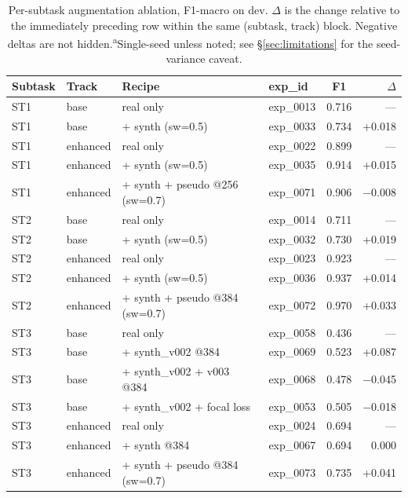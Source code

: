 \begin{table}[h]
\centering
\small
\caption{Per-subtask augmentation ablation, F1-macro on dev. $\Delta$ is the change
relative to the immediately preceding row within the same (subtask, track) block.
Negative deltas are not hidden.\textsuperscript{a}Single-seed unless noted; see \S\ref{sec:limitations} for the seed-variance caveat.}
\label{tab:ablation}
\begin{tabular}{llllcr}
\toprule
Subtask & Track & Recipe & exp\_id & F1 & $\Delta$ \\
\midrule
ST1 & base     & real only                          & exp\_0013 & 0.716 & ---     \\ %
ST1 & base     & + synth (sw=0.5)                   & exp\_0033 & 0.734 & +0.018 \\ %
\addlinespace
ST1 & enhanced & real only                          & exp\_0022 & 0.899 & ---     \\ %
ST1 & enhanced & + synth (sw=0.5)                   & exp\_0035 & 0.914 & +0.015 \\ %
ST1 & enhanced & + synth + pseudo @256 (sw=0.7)     & exp\_0071 & 0.906 & $-$0.008 \\ %
\midrule
ST2 & base     & real only                          & exp\_0014 & 0.711 & ---     \\ %
ST2 & base     & + synth (sw=0.5)                   & exp\_0032 & 0.730 & +0.019 \\ %
\addlinespace
ST2 & enhanced & real only                          & exp\_0023 & 0.923 & ---     \\ %
ST2 & enhanced & + synth (sw=0.5)                   & exp\_0036 & 0.937 & +0.014 \\ %
ST2 & enhanced & + synth + pseudo @384 (sw=0.7)     & exp\_0072 & 0.970 & +0.033 \\ %
\midrule
ST3 & base     & real only                          & exp\_0058 & 0.436 & ---     \\ %
ST3 & base     & + synth\_v002 @384                 & exp\_0069 & 0.523 & +0.087 \\ %
ST3 & base     & + synth\_v002 + v003 @384          & exp\_0068 & 0.478 & $-$0.045 \\ %
ST3 & base     & + synth\_v002 + focal loss         & exp\_0053 & 0.505 & $-$0.018 \\ %
\addlinespace
ST3 & enhanced & real only                          & exp\_0024 & 0.694 & ---     \\ %
ST3 & enhanced & + synth @384                       & exp\_0067 & 0.694 & 0.000  \\ %
ST3 & enhanced & + synth + pseudo @384 (sw=0.7)     & exp\_0073 & 0.735 & +0.041 \\ %
\bottomrule
\end{tabular}
\end{table}

